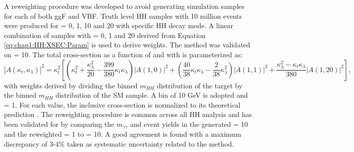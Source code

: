 A reweighting procedure was developed to avoid generating simulation samples for each \kl of both ggF and VBF. Truth level HH samples with 10 million events were produced for \kl= 0, 1, 10 and 20 with specific HH decay mode. A linear combination of samples with \kl= 0, 1 and 20 derived from Equation \ref{eq:chap1:HH:XSEC:Param} is used to derive weights. The method was validated on \kl= 10. The total cross-section as a function of \kl and \kt with is parameterized as:
\begin{equation}
    \left|A\left(\kappa_{t}, \kappa_{\lambda}\right)\right|^{2}=\kappa_{t}^{2}\left[\left(\kappa_{t}^{2}+\frac{\kappa_{\lambda}^{2}}{20}-\frac{399}{380} \kappa_{t} \kappa_{\lambda}\right)|A(1,0)|^{2}+\left(\frac{40}{38} \kappa_{t} \kappa_{\lambda}-\frac{2}{38} \kappa_{\lambda}^{2}\right)|A(1,1)|^{2}+\frac{\kappa_{\lambda}^{2}-\kappa_{t} \kappa_{\lambda}}{380}|A(1,20)|^{2}\right],
\end{equation}
with weights derived by dividing the binned $m_{HH}$ distribution of the target \kl by the binned $m_{HH}$ distribution of the SM sample. A bin of 10 GeV is adopted and \kt= 1. For each \kl value, the inclusive cross-section is normalized to its theoretical prediction \cite{LHE}. The reweighting procedure is common across all HH analysis and has been validated for \HHyybb by comparing the $m_{\gamma\gamma}$ and event yields in the generated \kl= 10 and the reweighted \kl= 1 to \kl= 10. A good agreement is found with a maximum discrepancy of 3-4\% taken as systematic uncertainty related to the method.  \\ 

